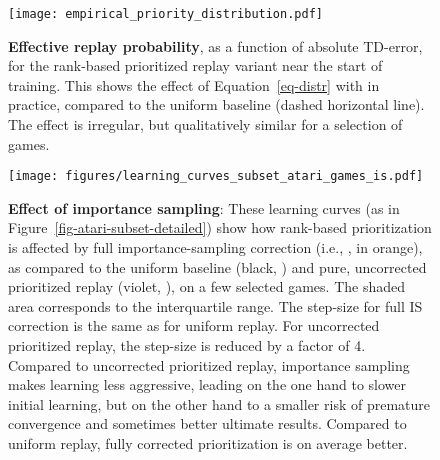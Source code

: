 \documentclass[a4paper]{article}
\begin{document}
\begin{figure}[p]
\centerline{
\texttt{[image: empirical\_priority\_distribution.pdf]}
}
\caption{
\label{fig-priority-distribution}
{\bf Effective replay probability}, as a function of absolute TD-error, for the rank-based prioritized replay variant near the start of training. 
This shows the effect of Equation~\ref{eq-distr} with  in practice, compared to the uniform baseline (dashed horizontal line).
The effect is irregular, but qualitatively similar for a selection of games.
}
\end{figure}


\begin{figure}[p]
\centerline{
\texttt{[image: figures/learning\_curves\_subset\_atari\_games\_is.pdf]}
}
\caption{
\label{fig-atari-is}
{\bf Effect of importance sampling}: These learning curves (as in Figure~\ref{fig-atari-subset-detailed})
show how rank-based prioritization is affected by full importance-sampling correction (i.e., , in orange),
as compared to the uniform baseline (black, ) and pure, uncorrected prioritized replay (violet, ),
on a few selected games. The shaded area corresponds to the interquartile range.  The step-size for full IS correction is the same as for uniform replay. For uncorrected prioritized replay, the step-size is reduced by a factor of 4.
Compared to uncorrected prioritized replay, importance sampling makes learning less aggressive, 
leading on the one hand to slower initial learning, 
but on the other hand to a smaller risk of premature convergence and sometimes better ultimate results.
Compared to uniform replay, fully corrected prioritization is on average better.
}
\end{figure}
\end{document}
